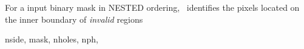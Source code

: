 \sloppy
{}\section[size\_holes\_nest]{ }
\label{sub:size_holes_nest}
\author{Eric Hivon}

\begin{facility}
{For a input binary mask in NESTED ordering, \thedocid\ identifies the pixels
located on the inner boundary of {\em invalid} regions
}
{\modMaskTools}
\end{facility}

\begin{f90format}
{nside, mask, nholes, nph,  }
\end{f90format}
\aboutoptional

